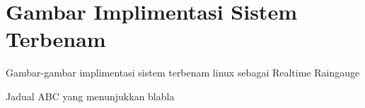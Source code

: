 \chapter{Gambar Implimentasi Sistem Terbenam}

Gambar-gambar implimentasi sistem terbenam linux sebagai Realtime Raingauge

\begin{table}
    \caption[Jadual abc]{Jadual ABC yang menunjukkan blabla}
    \label{c2:f1}
\end{table}

